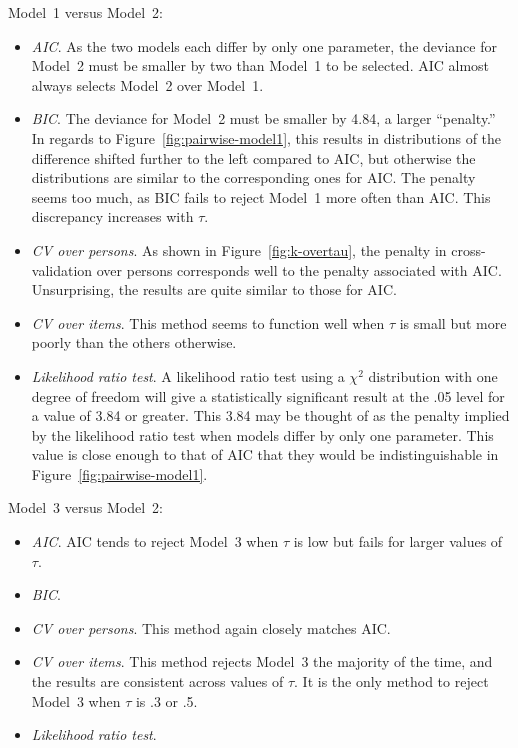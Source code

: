 \documentclass[12pt, letterpaper]{article}
\begin{document}
Model~1 versus Model~2:
\begin{itemize}
	\item \emph{AIC}. As the two models each differ by only one parameter, the deviance for Model~2 must be smaller by two than Model~1 to be selected. AIC almost always selects Model~2 over Model~1.
	\item \emph{BIC}. The deviance for Model~2 must be smaller by 4.84, a larger ``penalty.'' In regards to Figure~\ref{fig:pairwise-model1}, this results in distributions of the difference shifted further to the left compared to AIC, but otherwise the distributions are similar to the corresponding ones for AIC. The penalty seems too much, as BIC fails to reject Model~1 more often than AIC. This discrepancy increases with $\tau$.
	\item \emph{CV over persons}. As shown in Figure~\ref{fig:k-overtau}, the penalty in cross-validation over persons corresponds well to the penalty associated with AIC. Unsurprising, the results are quite similar to those for AIC.
	\item \emph{CV over items}. This method seems to function well when $\tau$ is small but more poorly than the others otherwise.
	\item \emph{Likelihood ratio test}. A likelihood ratio test using a $\chi^2$ distribution with one degree of freedom will give a statistically significant result at the .05 level for a value of 3.84 or greater. This 3.84 may be thought of as the penalty implied by the likelihood ratio test when models differ by only one parameter. This value is close enough to that of AIC that they would be indistinguishable in Figure~\ref{fig:pairwise-model1}.
\end{itemize}

Model~3 versus Model~2:
\begin{itemize}
	\item \emph{AIC}. AIC tends to reject Model~3 when $\tau$ is low but fails for larger values of $\tau$.
	\item \emph{BIC}. 
	\item \emph{CV over persons}. This method again closely matches AIC.
	\item \emph{CV over items}. This method rejects Model~3 the majority of the time, and the results are consistent across values of $\tau$. It is the only method to reject Model~3 when $\tau$ is .3 or .5.
	\item \emph{Likelihood ratio test}. 
\end{itemize}
\end{document}
